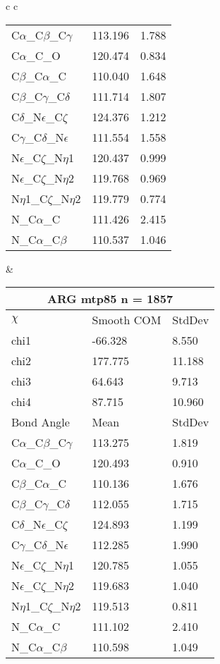 \begin{longtable}{ c c }
\begin{tabular}{ l l l }
  C$\alpha$\_C$\beta$\_C$\gamma$ & 113.196 & 1.788\\
  C$\alpha$\_C\_O & 120.474 & 0.834\\
  C$\beta$\_C$\alpha$\_C & 110.040 & 1.648\\
  C$\beta$\_C$\gamma$\_C$\delta$ & 111.714 & 1.807\\
  C$\delta$\_N$\epsilon$\_C$\zeta$ & 124.376 & 1.212\\
  C$\gamma$\_C$\delta$\_N$\epsilon$ & 111.554 & 1.558\\
  N$\epsilon$\_C$\zeta$\_N$\eta$1 & 120.437 & 0.999\\
  N$\epsilon$\_C$\zeta$\_N$\eta$2 & 119.768 & 0.969\\
  N$\eta$1\_C$\zeta$\_N$\eta$2 & 119.779 & 0.774\\
  N\_C$\alpha$\_C & 111.426 & 2.415\\
  N\_C$\alpha$\_C$\beta$ & 110.537 & 1.046\\
  \bottomrule
  \end{tabular}
  &
  \begin{tabular}{ l l l }
  \toprule
  \multicolumn{3}{c}{ARG \textbf{mtp85} n = 1857} \\ \toprule
  $\chi$       & Smooth COM & StdDev \\ \midrule
  chi1 & -66.328 & 8.550 \\ 
  chi2 & 177.775 & 11.188 \\ 
  chi3 & 64.643 & 9.713 \\ 
  chi4 & 87.715 & 10.960 \\ \midrule
  Bond Angle   & Mean     & StdDev \\ \midrule
  C$\alpha$\_C$\beta$\_C$\gamma$ & 113.275 & 1.819\\
  C$\alpha$\_C\_O & 120.493 & 0.910\\
  C$\beta$\_C$\alpha$\_C & 110.136 & 1.676\\
  C$\beta$\_C$\gamma$\_C$\delta$ & 112.055 & 1.715\\
  C$\delta$\_N$\epsilon$\_C$\zeta$ & 124.893 & 1.199\\
  C$\gamma$\_C$\delta$\_N$\epsilon$ & 112.285 & 1.990\\
  N$\epsilon$\_C$\zeta$\_N$\eta$1 & 120.785 & 1.055\\
  N$\epsilon$\_C$\zeta$\_N$\eta$2 & 119.683 & 1.040\\
  N$\eta$1\_C$\zeta$\_N$\eta$2 & 119.513 & 0.811\\
  N\_C$\alpha$\_C & 111.102 & 2.410\\
  N\_C$\alpha$\_C$\beta$ & 110.598 & 1.049\\

\end{tabular}
\end{longtable}
